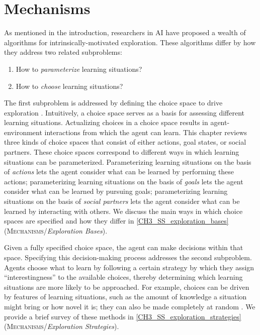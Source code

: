 \section{Mechanisms}\label{CH3_S_mechanisms}
As mentioned in the introduction, researchers in \ac{AI} have proposed a wealth of algorithms for intrinsically-motivated exploration. These algorithms differ by how they address two related subproblems:

\begin{enumerate}
    \item How to \textit{parameterize} learning situations?
    \item How to \textit{choose} learning situations?
\end{enumerate}

The first subproblem is addressed by defining the choice space to drive exploration \parencite{moulin-frier_exploration_2013}. Intuitively, a choice space serves as a basis for assessing different learning situations. Actualizing choices in a choice space results in agent-environment interactions from which the agent can learn. This chapter reviews three kinds of choice spaces that consist of either actions, goal states, or social partners. These choice spaces correspond to different ways in which learning situations can be parameterized. Parameterizing learning situations on the basis of \emph{actions} lets the agent consider what can be learned by performing these actions; parameterizing learning situations on the basis of \emph{goals} lets the agent consider what can be learned by pursuing goals; parameterizing learning situations on the basis of \emph{social partners} lets the agent consider what can be learned by interacting with others. We discuss the main ways in which choice spaces are specified and how they differ in \cref{CH3_SS_exploration_bases} (\textsc{Mechanisms}/\textit{Exploration Bases}).

Given a fully specified choice space, the agent can make decisions within that space. Specifying this decision-making process addresses the second subproblem. Agents choose what to learn by following a certain strategy by which they assign “interestingness” to the available choices, thereby determining which learning situations are more likely to be approached. For example, choices can be driven by features of learning situations, such as the amount of knowledge a situation might bring or how novel it is; they can also be made completely at random \cite[e.g., ][]{colas_gep-pg_2018,colas_language_2020}. We provide a brief survey of these methods in \autoref{CH3_SS_exploration_strategies} (\textsc{Mechanisms}/\textit{Exploration Strategies}).

